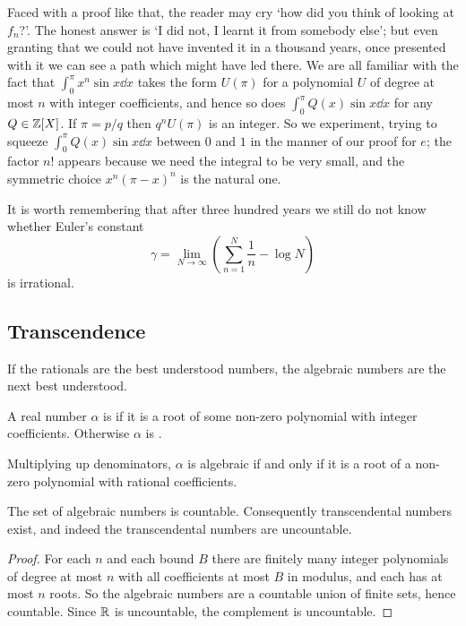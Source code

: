\documentclass[a4paper]{scrartcl}
\begin{document}
Faced with a proof like that, the reader may cry `how did you think of looking at $f_n$?'. The honest answer is `I did not, I learnt it from somebody else'; but even granting that we could not have invented it in a thousand years, once presented with it we can see a path which might have led there. We are all familiar with the fact that $\int_0^\pi x^n\sin x\dd x$ takes the form $U(\pi)$ for a polynomial $U$ of degree at most $n$ with integer coefficients, and hence so does $\int_0^\pi Q(x)\sin x\dd x$ for any $Q\in\mathbb{Z}[X]$. If $\pi=p/q$ then $q^nU(\pi)$ is an integer. So we experiment, trying to squeeze $\int_0^\pi Q(x)\sin x\dd x$ between $0$ and $1$ in the manner of our proof for $e$; the factor $n!$ appears because we need the integral to be very small, and the symmetric choice $x^n(\pi-x)^n$ is the natural one.

It is worth remembering that after three hundred years we still do not know whether Euler's constant
$$\gamma = \lim_{N\to\infty}\left(\sum_{n=1}^N\frac1n - \log N\right)$$
is irrational.

\subsection{Transcendence}

If the rationals are the best understood numbers, the algebraic numbers are the next best understood.

\begin{definition}
	A real number $\alpha$ is  if it is a root of some non-zero polynomial with integer coefficients. Otherwise $\alpha$ is .
\end{definition}

Multiplying up denominators, $\alpha$ is algebraic if and only if it is a root of a non-zero polynomial with rational coefficients.

\begin{lemma}
	The set of algebraic numbers is countable. Consequently transcendental numbers exist, and indeed the transcendental numbers are uncountable.
\end{lemma}

\begin{proof}
	For each $n$ and each bound $B$ there are finitely many integer polynomials of degree at most $n$ with all coefficients at most $B$ in modulus, and each has at most $n$ roots. So the algebraic numbers are a countable union of finite sets, hence countable. Since $\mathbb{R}$ is uncountable, the complement is uncountable.
\end{proof}
\end{document}
